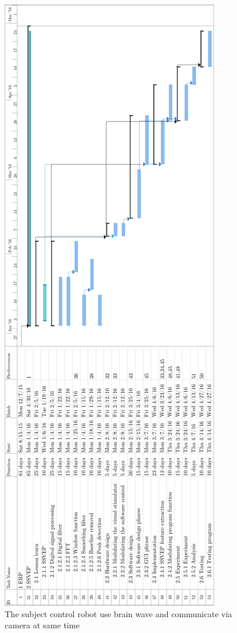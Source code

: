 \begin{figure}[ht]
	\centering
	\includegraphics[scale = 0.4]{chapter1/gan2.pdf}
	\caption{The subject control robot use brain wave and communicate via camera at same time}
\end{figure}

